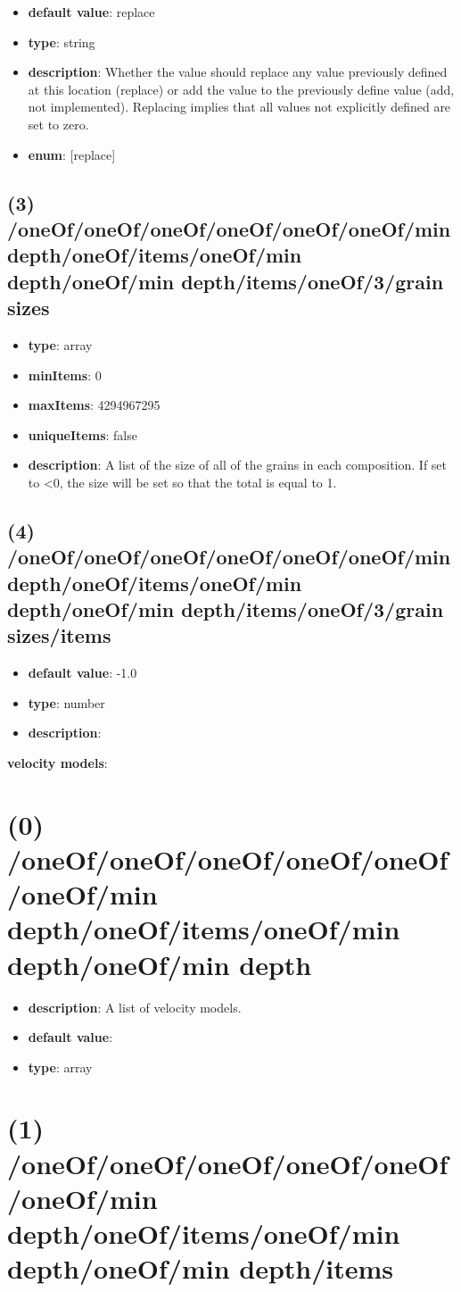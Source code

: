\begin{itemize}[leftmargin=3em]\item {\bf default value}: replace
\item {\bf type}: string
\item {\bf description}: Whether the value should replace any value previously defined at this location (replace) or add the value to the previously define value (add, not implemented). Replacing implies that all values not explicitly defined are set to zero.
\item {\bf enum}: [replace]\end{itemize}\subsection{(3) /oneOf/oneOf/oneOf/oneOf/oneOf/oneOf/min depth/oneOf/items/oneOf/min depth/oneOf/min depth/items/oneOf/3/grain sizes}
\begin{itemize}[leftmargin=3em]\item {\bf type}: array
\item {\bf minItems}: 0
\item {\bf maxItems}: 4294967295
\item {\bf uniqueItems}: false
\item {\bf description}: A list of the size of all of the grains in each composition. If set to <0, the size will be set so that the total is equal to 1.
\end{itemize}\subsection{(4) /oneOf/oneOf/oneOf/oneOf/oneOf/oneOf/min depth/oneOf/items/oneOf/min depth/oneOf/min depth/items/oneOf/3/grain sizes/items}
\begin{itemize}[leftmargin=4em]\item {\bf default value}: -1.0
\item {\bf type}: number
\item {\bf description}: 
\end{itemize}\item {\bf velocity models}: \section{(0) /oneOf/oneOf/oneOf/oneOf/oneOf/oneOf/min depth/oneOf/items/oneOf/min depth/oneOf/min depth}
\begin{itemize}[leftmargin=0em]\item {\bf description}: A list of velocity models.
\item {\bf default value}: 
\item {\bf type}: array
\end{itemize}\section{(1) /oneOf/oneOf/oneOf/oneOf/oneOf/oneOf/min depth/oneOf/items/oneOf/min depth/oneOf/min depth/items}

